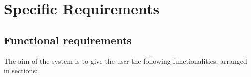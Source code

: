 %
%
\chapter{Specific Requirements}
%
\label{cap:specificrequirements}
%

\section{Functional requirements}
The aim of the system is to give the user the following functionalities, arranged in sections:
